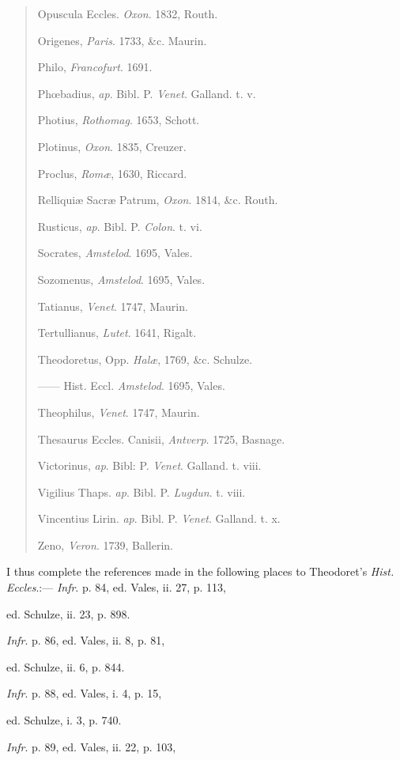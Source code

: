 \begin{quote}
Opuscula Eccles. \emph{Oxon}. 1832, Routh.

Origenes, \emph{Paris}. 1733, \&c. Maurin.

Philo, \emph{Francofurt}. 1691.

Phœbadius, \emph{ap}. Bibl. P. \emph{Venet}. Galland. t. v.

Photius, \emph{Rothomag}. 1653, Schott.

Plotinus, \emph{Oxon}. 1835, Creuzer.

Proclus, \emph{Romæ}, 1630, Riccard.

Relliquiæ Sacræ Patrum, \emph{Oxon}. 1814, \&c. Routh.

Rusticus, \emph{ap}. Bibl. P. \emph{Colon}. t. vi.

Socrates, \emph{Amstelod}. 1695, Vales.

Sozomenus, \emph{Amstelod}. 1695, Vales.

Tatianus, \emph{Venet}. 1747, Maurin.

Tertullianus, \emph{Lutet}. 1641, Rigalt.

Theodoretus, Opp. \emph{Halæ}, 1769, \&c. Schulze.

—— Hist. Eccl. \emph{Amstelod}. 1695, Vales.

Theophilus, \emph{Venet}. 1747, Maurin.

Thesaurus Eccles. Canisii, \emph{Antverp}. 1725, Basnage.

Victorinus, \emph{ap}. Bibl: P. \emph{Venet}. Galland. t. viii.

Vigilius Thaps. \emph{ap}. Bibl. P. \emph{Lugdun}. t. viii.

Vincentius Lirin. \emph{ap}. Bibl. P. \emph{Venet}. Galland. t. x.

Zeno, \emph{Veron}. 1739, Ballerin.

\end{quote}




I thus complete the references made in the following places to
Theodoret's \emph{Hist. Eccles}.:—
\emph{Infr}. p. 84, ed. Vales, ii. 27, p. 113,

ed. Schulze, ii. 23, p. 898.

\emph{Infr}. p. 86, ed. Vales, ii. 8, p. 81,

ed. Schulze, ii. 6, p. 844.

\emph{Infr}. p. 88, ed. Vales, i. 4, p. 15,

ed. Schulze, i. 3, p. 740.

\emph{Infr}. p. 89, ed. Vales, ii. 22, p. 103,

